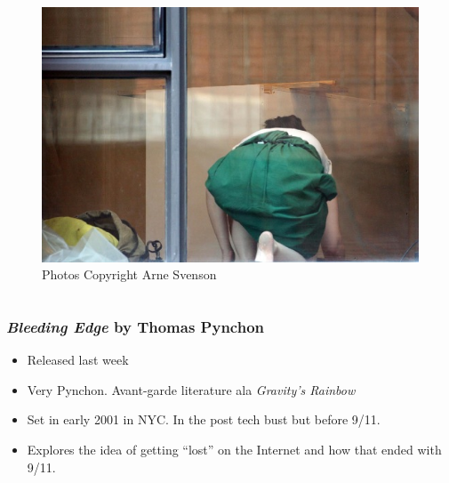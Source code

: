 \documentclass{beamer}
\begin{document}
\begin{frame}
\begin{columns}[c]
    \begin{figure}
    \includegraphics[width=\textwidth,height=0.8\textheight,keepaspectratio]{img/4_website_IMG_3013.jpg}
    \caption{Photos Copyright Arne Svenson}
    \end{figure}

    \end{columns}


\end{frame}

\begin{frame}

\frametitle{\emph{Bleeding Edge} by Thomas Pynchon}

\begin{itemize}
\item Released last week
\item Very Pynchon.  Avant-garde literature ala \emph{Gravity's
  Rainbow}
\item Set in early 2001 in NYC.  In the post tech bust but before
  9/11.
\item Explores the idea of getting ``lost'' on the Internet and how
  that ended with 9/11.
\end{itemize}
\end{frame}




\end{document}
